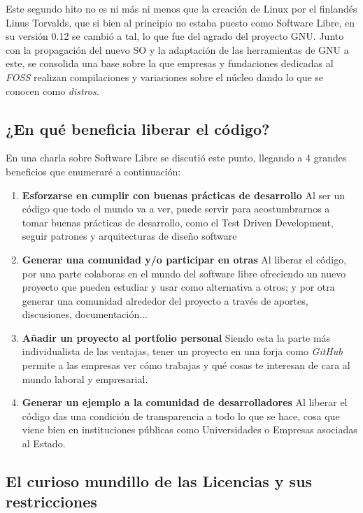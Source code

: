 Este segundo hito no es ni más ni menos que la creación de Linux por el finlandés Linus Torvalds, que si bien al principio no estaba puesto como Software Libre, en su versión 0.12 se cambió a tal, lo que fue del agrado del proyecto GNU. Junto con la propagación del nuevo SO y la adaptación de las herramientas de GNU a este, se consolida una base sobre la que empresas y fundaciones dedicadas al \textit{FOSS} realizan compilaciones y variaciones sobre el núcleo dando lo que se conocen como \textit{distros}.

\subsection{¿En qué beneficia liberar el código?}
En una charla sobre Software Libre se discutió este punto, llegando a 4 grandes beneficios que enumeraré a continuación:

\begin{enumerate}
	\item \textbf{Esforzarse en cumplir con buenas prácticas de desarrollo} Al ser un código que todo el mundo va a ver, puede servir para acostumbrarnos a tomar buenas prácticas de desarrollo, como el Test Driven Development, seguir patrones y arquitecturas de diseño software
	\item \textbf{Generar una comunidad y/o participar en otras} Al liberar el código, por una parte colaboras en el mundo del software libre ofreciendo un nuevo proyecto que pueden estudiar y usar como alternativa a otros; y por otra generar una comunidad alrededor del proyecto a través de aportes, discusiones, documentación...
	\item \textbf{Añadir un proyecto al portfolio personal} Siendo esta la parte más individualista de las ventajas, tener un proyecto en una forja como \textit{GitHub} permite a las empresas ver cómo trabajas y qué cosas te interesan de cara al mundo laboral y empresarial.
	\item \textbf{Generar un ejemplo a la comunidad de desarrolladores} Al liberar el código das una condición de transparencia a todo lo que se hace, cosa que viene bien en instituciones públicas como Universidades o Empresas asociadas al Estado.
\end{enumerate}



\subsection{El curioso mundillo de las Licencias y sus restricciones}

